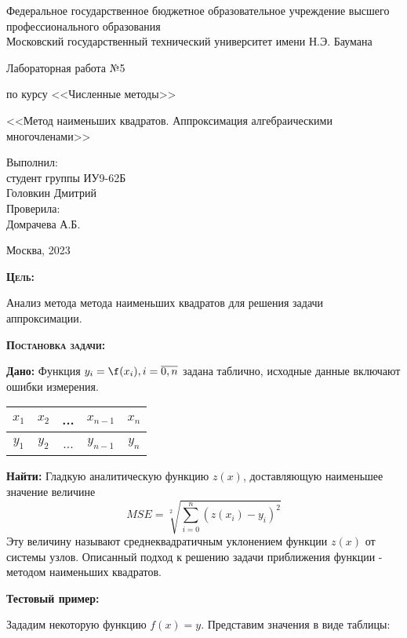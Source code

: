 \documentclass [12pt]{article}
\title{}
\date{}
\author{}
\begin{document}
\begin{titlepage}
\thispagestyle{empty}
\begin{center}
Федеральное государственное бюджетное образовательное учреждение высшего профессионального образования \\Московский государственный технический университет имени Н.Э. Баумана

\end{center}
\vfill
\centerline{\large{Лабораторная работа №5}}
\centerline{\large{по курсу <<Численные методы>>}}
\centerline{\large{<<Метод наименьших квадратов. Аппроксимация алгебраическими многочленами>>}}
\vfill
\hfill\parbox{5cm} {
           Выполнил:\\
           студент группы ИУ9-62Б \hfill \\
           Головкин Дмитрий\hfill \medskip\\
           Проверила:\\
           Домрачева А.Б.\hfill
       }
\centerline{Москва, 2023}
\clearpage
\end{titlepage}

\textsc{\textbf{Цель:}} 

Анализ метода метода наименьших квадратов для решения задачи аппроксимации.

\textsc{\textbf{Постановка задачи:}} 

\textbf{Дано:}  Функция $y_i = \f(x_i),  i = \overline{0,n}$ задана таблично, исходные данные включают ошибки измерения.

\begin{table}[h]
\begin{center}
\begin{tabular}{|c|c|c|c|c|}
\hline
$x_1$ & $x_2$ & ... & $x_{n-1}$ & $x_n$ \\
\hline
$y_1$ & $y_2$ & ... & $y_{n-1}$ & $y_n$ \\
\hline
\end{tabular}
\end{center}
\end{table}

\textbf{Найти:} Гладкую аналитическую функцию  $z(x)$, доставляющую наименьшее значение величине $$ MSE=\sqrt[2]{\sum\limits_{i = 0}^n{(z(x_i) - y_i)^2}}$$ Эту величину называют среднеквадратичным уклонением функции $z(x)$ от системы узлов. Описанный подход к решению задачи приближения функции - методом наименьших квадратов.

\textbf{Тестовый пример:} 

Зададим некоторую функцию $f(x) = y$. Представим значения в виде таблицы:
\end{document}
